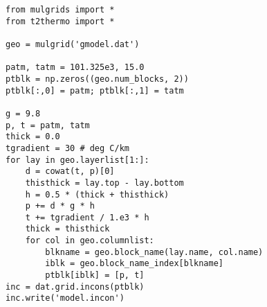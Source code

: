 \begin{lstlisting}
from mulgrids import *
from t2thermo import *

geo = mulgrid('gmodel.dat')

patm, tatm = 101.325e3, 15.0
ptblk = np.zeros((geo.num_blocks, 2))
ptblk[:,0] = patm; ptblk[:,1] = tatm

g = 9.8
p, t = patm, tatm
thick = 0.0
tgradient = 30 # deg C/km
for lay in geo.layerlist[1:]:
    d = cowat(t, p)[0]
    thisthick = lay.top - lay.bottom
    h = 0.5 * (thick + thisthick)
    p += d * g * h
    t += tgradient / 1.e3 * h
    thick = thisthick
    for col in geo.columnlist:
        blkname = geo.block_name(lay.name, col.name)
        iblk = geo.block_name_index[blkname]
        ptblk[iblk] = [p, t]
inc = dat.grid.incons(ptblk)
inc.write('model.incon')
\end{lstlisting}
